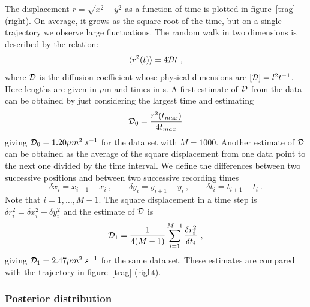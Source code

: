 \documentclass{article}
\def\DD{{\cal D}}
\newcommand{\beq}{\begin{equation}}
\newcommand{\eeq}{\end{equation}}
\begin{document}
 The displacement $r=\sqrt {x^2+y^2}$ as a function of time is plotted in figure~\ref{trag} (right). On average, it grows as the square root of the time, but on a single trajectory we observe large fluctuations. 
 The random walk in two dimensions is described by the relation:
\begin{equation}
\langle r^2(t) \rangle= 4 \DD t \ ,
 \end{equation}
where $\DD$ is the diffusion coefficient whose physical dimensions are  ${[\DD]=l^2 t^{-1}}$. Here lengths are given in $\mu$m and times in s.
A first estimate of $\DD$ from the data can be obtained by just considering the largest time and estimating
\begin{equation}
\DD_0 = \frac{r^2(t_{max})}{4 t_{max}}
\end{equation}
giving $\DD_0=1.20 \mu m^2\;s^{-1}$ for the data set with $M=1000$.
Another estimate of $\DD$ can be obtained as the average of the square displacement from one data point to the next one divided by the time interval.
 We define the differences between two successive positions and between two successive recording times
  \beq
 \delta x_i=x_{i+1}-x_i \ ,\qquad \delta y_i=y_{i+1}-y_i \ , \qquad \delta t_i=t_{i+1}-t_i \ .
 \eeq 
 Note that $i=1,\ldots, M-1$. The  square displacement in a time step is  $\delta r_i^2= \delta x_i^2+\delta y_i^2 $ and the estimate of $\DD$ is
 \begin{equation}
 \DD_1=\frac {1}{4 (M-1)}\sum_{i=1}^{M-1} \frac{ \delta r_i^2}{\delta t_i} \ ,
 \end{equation}
 giving $\DD_1=2.47 \mu m^2\;s^{-1}$ for the same data set.
 These estimates are compared with the trajectory in figure~\ref{trag} (right).



\subsubsection*{Posterior distribution}

\end{document}
